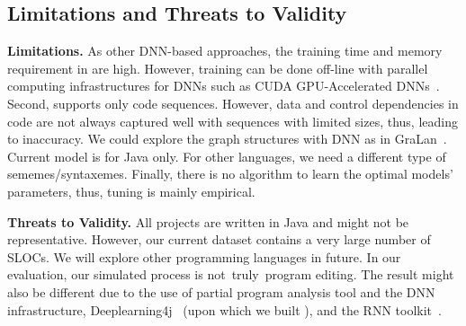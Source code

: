 \subsection{Limitations and Threats to Validity}

\noindent
{\bf Limitations.} As other DNN-based approaches, the training time
and memory requirement in {\tool} are high.
However, training can be done off-line with
parallel computing infrastructures for DNNs such as CUDA
GPU-Accelerated DNNs~\cite{cuda-dnn}. Second, {\tool} supports only
code sequences. However, data and control dependencies in code are not
always captured well with sequences with limited sizes, thus, leading
to inaccuracy. We could explore the graph structures with DNN as in
GraLan~\cite{icse15}. 
Current model is for Java only. For other languages, we need a
different type of sememes/syntaxemes. Finally, there is no algorithm
to learn the optimal models' parameters, thus, tuning is mainly
empirical.

\vspace{0.03in}
\noindent
{\bf Threats to Validity.} All projects are written in Java and might
not be representative. However, our current dataset contains a very
large number of SLOCs. We will explore other programming languages in
future. In our evaluation, our simulated process is not~truly~program
editing.  The result might also be different due to the use of partial
program analysis tool and the DNN infrastructure,
Deeplearning4j~\cite{Deeplearning4j} (upon which we built {\tool}),
and the RNN toolkit~\cite{rnntool}.




